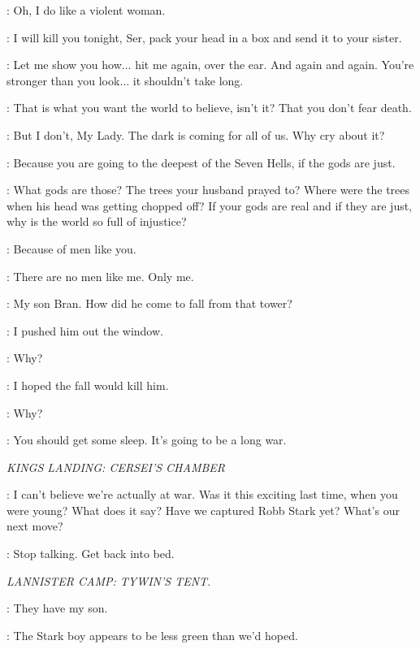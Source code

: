 
\JAIME: Oh, I do like a violent woman. 

\CATELYN: I will kill you tonight, Ser, pack your head in a box and send it to your sister. 

\JAIME: Let me show you how$\ldots$  hit me again, over the ear. And again and again. You're stronger than you look$\ldots$ it shouldn't take long. 

\CATELYN: That is what you want the world to believe, isn't it? That you don't fear death. 

\JAIME: But I don't, My Lady. The dark is coming for all of us. Why cry about it? 

\CATELYN: Because you are going to the deepest of the Seven Hells, if the gods are just. 

\JAIME: What gods are those? The trees your husband prayed to? Where were the trees when his head was getting chopped off? If your gods are real and if they are just, why is the world so full of injustice? 

\CATELYN: Because of men like you. 

\JAIME: There are no men like me. Only me. 

\CATELYN: My son Bran. How did he come to fall from that tower? 

\JAIME: I pushed him out the window. 

\CATELYN: Why? 

\JAIME: I hoped the fall would kill him. 

\CATELYN: Why? 

\JAIME: You should get some sleep. It's going to be a long war. 


\scene

\textit{KINGS LANDING: CERSEI'S CHAMBER}


\LANCEL: I can't believe we're actually at war. Was it this exciting last time, when you were young? What does it say? Have we captured Robb Stark yet? What's our next move? 

\CERSEI: Stop talking. Get back into bed. 


\scene

\textit{LANNISTER CAMP: TYWIN'S TENT.}


\TYWIN: They have my son. 

\TYRION: The Stark boy appears to be less green than we'd hoped. 

